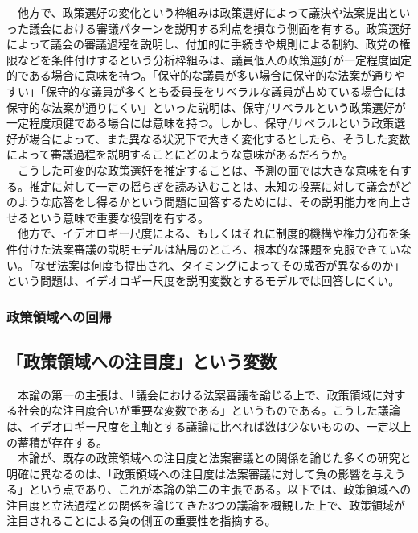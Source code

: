 　他方で、政策選好の変化という枠組みは政策選好によって議決や法案提出といった議会における審議パターンを説明する利点を損なう側面を有する。政策選好によって議会の審議過程を説明し、付加的に手続きや規則による制約、政党の権限などを条件付けするという分析枠組みは、議員個人の政策選好が一定程度固定的である場合に意味を持つ。「保守的な議員が多い場合に保守的な法案が通りやすい」「保守的な議員が多くとも委員長をリベラルな議員が占めている場合には保守的な法案が通りにくい」といった説明は、保守/リベラルという政策選好が一定程度頑健である場合には意味を持つ。しかし、保守/リベラルという政策選好が場合によって、また異なる状況下で大きく変化するとしたら、そうした変数によって審議過程を説明することにどのような意味があるだろうか。\\
　こうした可変的な政策選好を推定することは、予測の面では大きな意味を有する。推定に対して一定の揺らぎを読み込むことは、未知の投票に対して議会がどのような応答をし得るかという問題に回答するためには、その説明能力を向上させるという意味で重要な役割を有する。\\
　他方で、イデオロギー尺度による、もしくはそれに制度的機構や権力分布を条件付けた法案審議の説明モデルは結局のところ、根本的な課題を克服できていない。「なぜ法案は何度も提出され、タイミングによってその成否が異なるのか」という問題は、イデオロギー尺度を説明変数とするモデルでは回答しにくい。\\
\subsubsection{政策領域への回帰}

\subsection{「政策領域への注目度」という変数}
　本論の第一の主張は、「議会における法案審議を論じる上で、政策領域に対する社会的な注目度合いが重要な変数である」というものである。こうした議論は、イデオロギー尺度を主軸とする議論に比べれば数は少ないものの、一定以上の蓄積が存在する。\\
　本論が、既存の政策領域への注目度と法案審議との関係を論じた多くの研究と明確に異なるのは、「政策領域への注目度は法案審議に対して負の影響を与えうる」という点であり、これが本論の第二の主張である。以下では、政策領域への注目度と立法過程との関係を論じてきた3つの議論を概観した上で、政策領域が注目されることによる負の側面の重要性を指摘する。\\

